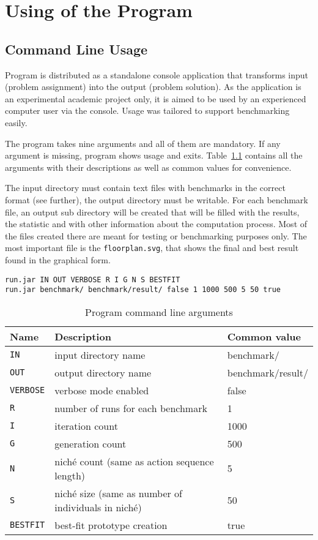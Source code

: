 \chapter{Using of the Program}
\label{sec:usage}

\section{Command Line Usage}

Program is distributed as a standalone console application that transforms input (problem assignment) into the output (problem solution). As the application is an experimental academic project only, it is aimed to be used by an experienced computer user via the console. Usage was tailored to support benchmarking easily.

The program takes nine arguments and all of them are mandatory. If any argument is missing, program shows usage and exits. Table~\ref{tab:args} contains all the arguments with their descriptions as well as common values for convenience.

The input directory must contain text files with benchmarks in the correct format (see further), the output directory must be writable. For each benchmark file, an output sub directory will be created that will be filled with the results, the statistic and with other information about the computation process. Most of the files created there are meant for testing or benchmarking purposes only. The most important file is the {\tt floorplan.svg}, that shows the final and best result found in the graphical form.

\begin{verbatim}
run.jar IN OUT VERBOSE R I G N S BESTFIT
run.jar benchmark/ benchmark/result/ false 1 1000 500 5 50 true
\end{verbatim}

\begin{table}
\begin{center}
\begin{tabular}{|l|l|l|}
\hline
Name & Description & Common value \\
\hline
\hline
{\tt IN} & input directory name & benchmark/ \\
\hline
{\tt OUT} & output directory name & benchmark/result/ \\
\hline
{\tt VERBOSE} & verbose mode enabled & false \\
\hline
{\tt R} & number of runs for each benchmark & 1 \\
\hline
{\tt I} & iteration count & 1000 \\
\hline
{\tt G} & generation count & 500 \\
\hline
{\tt N} & niché count (same as action sequence length) & 5 \\
\hline
{\tt S} & niché size (same as number of individuals in niché) & 50 \\
\hline
{\tt BESTFIT} & best-fit prototype creation & true \\
\hline
\end{tabular}
\end{center}
\caption{Program command line arguments}
\label{tab:args}
\end{table}

